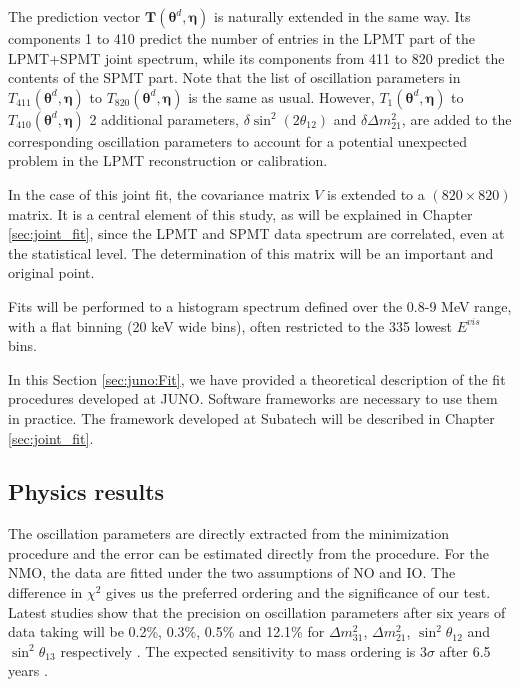 \documentclass[../main.tex]{subfiles}
\begin{document}
The prediction vector $\bm{T}\left(\bm{\theta}^d,\bm{\eta}\right)$ is naturally extended in the same way. Its components 1 to 410 predict the number of entries in the LPMT part of the LPMT+SPMT joint spectrum, while its components from 411 to 820 predict the contents of the SPMT part. Note that the list of oscillation parameters in $T_{411}(\bm{\theta}^d,\bm{\eta})$ to $T_{820}(\bm{\theta}^d,\bm{\eta})$ is the same as usual. However, $T_1(\bm{\theta}^d,\bm{\eta})$ to $T_{410}(\bm{\theta}^d,\bm{\eta})$ 2 additional parameters, $\delta \sin^2(2\theta_{12})$ and $\delta \Delta m^2_{21}$, are added to the corresponding oscillation parameters to account for a potential unexpected problem in the LPMT reconstruction or calibration.

In the case of this joint fit, the covariance matrix $V$ is extended to a $(820 \times 820)$ matrix. It is a central element of this study, as will be explained in Chapter \ref{sec:joint_fit}, since the LPMT and SPMT data spectrum are correlated, even at the statistical level. The determination of this matrix will be an important and original point.

Fits will be performed to a histogram spectrum defined over the 0.8-9 MeV range, with a flat binning (20 keV wide bins), often restricted to the 335 lowest $E^{vis}$ bins.

In this Section \ref{sec:juno:Fit}, we have provided a theoretical description of the fit procedures developed at JUNO. Software frameworks are necessary to use them in practice. The framework developed at Subatech will be described in Chapter \ref{sec:joint_fit}.

\subsection{Physics results}

The oscillation parameters are directly extracted from the minimization procedure and the error can be estimated directly from the procedure. For the NMO, the data are fitted under the two assumptions of NO and IO. The difference in $\chi^2$ gives us the preferred ordering and the significance of our test. Latest studies show that the precision on oscillation parameters after six years of data taking will be 0.2\%, 0.3\%, 0.5\% and 12.1\% for $\Delta m^2_{31}$, $\Delta m^2_{21}$, $\sin^2\theta_{12}$ and $\sin^2\theta_{13}$ respectively \cite{juno_collaboration_sub-percent_2022}. The expected sensitivity to mass ordering is $3\sigma$ after 6.5 years \cite{juno_collaboration_juno_2022}.
\end{document}
